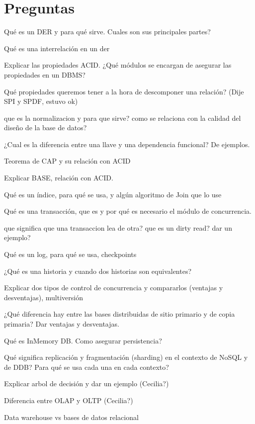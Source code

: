 \chapter{Preguntas}


Qué es un DER y para qué sirve. Cuales son sus principales partes?

Qué es una interrelación en un der

Explicar las propiedades ACID. ¿Qué módulos se encargan de asegurar las propiedades en un DBMS?

Qué propiedades queremos tener a la hora de descomponer una relación? (Dije SPI y SPDF, estuvo ok)

que es la normalizacion y para que sirve? como se relaciona con la calidad del diseño de la base de datos?

¿Cual es la diferencia entre una llave y una dependencia funcional? De ejemplos.

Teorema de CAP y su relación con ACID

Explicar BASE, relación con ACID.

Qué es un índice, para qué se usa, y algún algoritmo de Join que lo use

Qué es una transacción, que es y por qué es necesario el módulo de concurrencia.

que significa que una transaccion lea de otra? que es un dirty read? dar un ejemplo?

Qué es un log, para qué se usa, checkpoints

¿Qué es una historia y cuando dos historias son equivalentes?

Explicar dos tipos de control de concurrencia y compararlos (ventajas y desventajas), multiversión

¿Qué diferencia hay entre las bases distribuidas de sitio primario y de copia primaria? Dar ventajas y desventajas.

Qué es InMemory DB. Como asegurar persistencia?

Qué significa replicación y fragmentación (sharding) en el contexto de NoSQL y de DDB? Para qué se usa cada una en cada contexto?

Explicar arbol de decisión y dar un ejemplo (Cecilia?)

Diferencia entre OLAP y OLTP (Cecilia?)

Data warehouse vs bases de datos relacional
